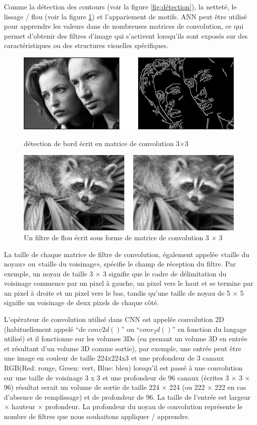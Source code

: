 \documentclass[12pt]{article}
\begin{document}
Comme la détection des contours (voir la figure \ref{fig:détection}), la netteté, le lissage / flou (voir la figure \ref{fig:filter}) et l’appariement de motifs. ANN peut être utilisé pour apprendre les valeurs dans de nombreuses matrices de convolution, ce qui permet d'obtenir des filtres d'image qui s'activent lorsqu'ils sont exposés sur des caractéristiques ou des structures visuelles spécifiques.
\begin{figure}[h]
	\centering
	\includegraphics[width=15cm]{img-Chapiter-1/CNN.png}
	\caption{détection de bord écrit en matrice de convolution 3×3}
	\label{fig:détection}
	\bigbreak
	\centering
	\includegraphics[width=15cm]{img-Chapiter-1/CNN2.png}
	\caption{Un filtre de flou écrit sous forme de matrice de convolution 3 × 3}
	\label{fig:filter}
\end{figure}

La taille de chaque matrice de filtre de convolution, également appelée «taille du noyau» ou «taille du voisinage», spécifie le champ de réception du filtre. Par exemple, un noyau de taille 3 × 3 signifie que le cadre de délimitation du voisinage commence par un pixel à gauche, un pixel vers le haut et se termine par un pixel à droite et un pixel vers le bas, tandis qu'une taille de noyau de 5 × 5 signifie un voisinage de deux pixels de chaque côté.

L'opérateur de convolution utilisé dans CNN est appelée convolution 2D (habituellement appelé “de $conv2d()$” ou “$conv_2d()$” en fonction du langage utilisé) et il fonctionne sur les volumes 3Ds (en prenant un volume 3D en entrée et résultant d'un volume 3D comme sortie), par exemple, une entrée peut être une image en couleur de taille 224x224x3 \cite{43} et une profondeur de 3 canaux RGB(Red: rouge, Green: vert, Blue: bleu) lorsqu'il est passé à une convolution sur une taille de voisinage 3 x 3 et une profondeur de 96 canaux (écrites 3 × 3 × 96) résultat serait un volume de sortie de taille 224 × 224 (ou 222 × 222 en cas d'absence de remplissage) et de profondeur de 96. La taille de l'entrée est largeur × hauteur × profondeur. La profondeur du noyau de convolution représente le nombre de filtres que nous souhaitons appliquer / apprendre.
\end{document}
